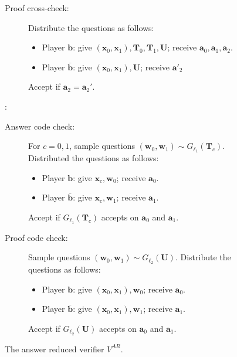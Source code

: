 \documentclass[10pt,a4paper]{article}
\theoremstyle{plain}
\theoremstyle{definition}
\newenvironment{Algorithm}{\begin{framed}}{\end{framed}}
\newcommand{\1}{\mathbb{1}} %
\newcommand{\ba}{\pmb{a}}
\newcommand{\bb}{\pmb{b}}
\newcommand{\bw}{\pmb{w}}
\newcommand{\bx}{\pmb{x}}
\newcommand{\bT}{\pmb{T}}
\newcommand{\bU}{\pmb{U}}
\begin{document}
\begin{figure}
\begin{center}
{\begin{minipage}{0.9\linewidth}
\begin{Algorithm}
\begin{description}
\begin{description}
    		\item[Proof cross-check:] Distribute the questions as follows:
    		\begin{itemize}
    		\item
    		Player $\bb$: give $(\bx_0, \bx_1), \bT_0, \bT_1, \bU$; receive $\ba_0, \ba_1, \ba_2$.
    		\item
    		Player $\overline{\bb}$: give $(\bx_0, \bx_1), \bU$; receive $\ba'_2$
    		\end{itemize}
    		Accept if $\ba_2 = \ba_2'$.
    	\end{description}
    	\item[Code checks]:
    	\begin{description}
    		\item[Answer code check:] For $c=0,1$, 
    		sample questions $(\bw_0, \bw_1) \sim G_{\ell_1}(\bT_{c})$.
    		Distributed the questions as follows:
    		\begin{itemize}
    		\item
    		Player $\bb$: give $\bx_{c}, \bw_0$; receive $\ba_0$.
    		\item
    		Player $\overline{\bb}$: give $\bx_{c}, \bw_1$; receive $\ba_1$.
    		\end{itemize}
    		Accept if $G_{\ell_1}(\bT_{c})$ accepts on $\ba_0$ and $\ba_1$.
    		\item[Proof code check:] 
    		Sample questions $(\bw_0, \bw_1) \sim G_{\ell_2}(\bU)$.
    		Distribute the questions as follows:
    		\begin{itemize}
    		\item
    		Player $\bb$: give $(\bx_0, \bx_1), \bw_0$; receive $\ba_0$.
    		\item
    		Player $\overline{\bb}$: give $(\bx_0, \bx_1), \bw_1$; receive $\ba_1$.
    		\end{itemize}
    		Accept if $G_{\ell_2}(\bU)$ accepts on $\ba_0$ and $\ba_1$.
    	\end{description}
    \end{description}
    \end{Algorithm}
    \caption{The answer reduced verifier $V^{AR}$.}
    \end{minipage}
    }
     \end{center}
     \label{fig:VAR}
 \end{figure}
\end{document}
